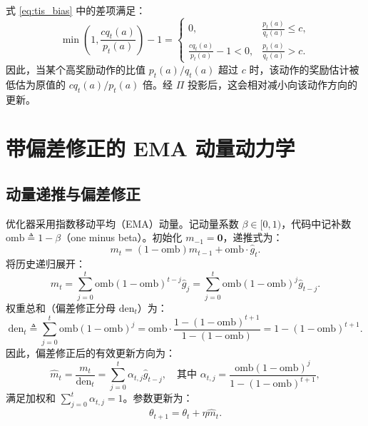 \documentclass[11pt, a4paper, UTF8]{ctexart}
\begin{document}
式 \eqref{eq:tis_bias} 中的差项满足：
\begin{equation}
    \min\left( 1, \frac{c q_t(a)}{p_t(a)} \right) - 1 = \begin{cases}
        0, & \frac{p_t(a)}{q_t(a)} \le c, \\
        \frac{c q_t(a)}{p_t(a)} - 1 < 0, & \frac{p_t(a)}{q_t(a)} > c.
    \end{cases}
\end{equation}
因此，当某个高奖励动作的比值 $p_t(a)/q_t(a)$ 超过 $c$ 时，该动作的奖励估计被低估为原值的 $c q_t(a)/p_t(a)$ 倍。经 $\Pi$ 投影后，这会相对减小向该动作方向的更新。

\section{带偏差修正的 EMA 动量动力学}

\subsection{动量递推与偏差修正}

优化器采用指数移动平均（EMA）动量。记动量系数 $\beta \in [0, 1)$，代码中记补数 $\mathrm{omb} \triangleq 1 - \beta$（one minus beta）。初始化 $m_{-1} = \mathbf{0}$，递推式为：
\begin{equation}
    m_t = (1 - \mathrm{omb}) m_{t-1} + \mathrm{omb} \cdot \hat{g}_t.
\end{equation}
将历史递归展开：
\begin{equation}
    m_t = \sum_{j=0}^t \mathrm{omb} (1 - \mathrm{omb})^{t-j} \hat{g}_j = \sum_{j=0}^t \mathrm{omb} (1 - \mathrm{omb})^j \hat{g}_{t-j}.
\end{equation}
权重总和（偏差修正分母 $\mathrm{den}_t$）为：
\begin{equation}
    \mathrm{den}_t \triangleq \sum_{j=0}^t \mathrm{omb} (1 - \mathrm{omb})^j = \mathrm{omb} \cdot \frac{1 - (1 - \mathrm{omb})^{t+1}}{1 - (1 - \mathrm{omb})} = 1 - (1 - \mathrm{omb})^{t+1}.
\end{equation}
因此，偏差修正后的有效更新方向为：
\begin{equation}
    \hat{m}_t = \frac{m_t}{\mathrm{den}_t} = \sum_{j=0}^t \alpha_{t, j} \hat{g}_{t-j}, \quad \text{其中 } \alpha_{t, j} = \frac{\mathrm{omb} (1 - \mathrm{omb})^j}{1 - (1 - \mathrm{omb})^{t+1}},
\end{equation}
满足加权和 $\sum_{j=0}^t \alpha_{t, j} = 1$。参数更新为：
\begin{equation}
    \theta_{t+1} = \theta_t + \eta \hat{m}_t.
\end{equation}
\end{document}
